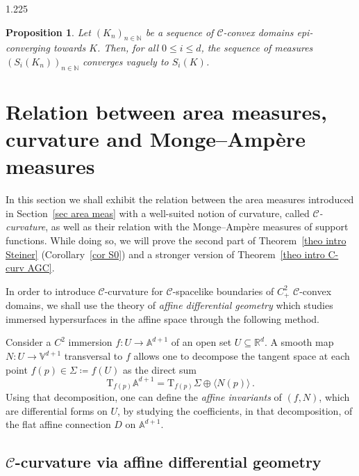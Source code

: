 \documentclass[reqno, a4paper]{amsart}
\numberwithin{equation}{section}
\numberwithin{figure}{section}
\newtheorem{proposition}[theorem]{Proposition}
\theoremstyle{definition}
\theoremstyle{remark}
\newcommand{\R}{\mathbb{R}} %
\newcommand{\N}{\mathbb{N}} %
\newcommand{\V}{\mathbb{V}} %
\newcommand{\A}{\mathbb{A}} %
\newcommand{\C}{\mathcal{C}} %
\begin{document}
\begin{spacing}{1.225}
\begin{proposition}
\label{prop vague convergence of Si}
Let $(K_n)_{n\in\N}$ be a sequence of $\C$-convex domains epi-converging towards $K$. Then, for all $0 \leq i \leq d$, the sequence of measures $(S_i(K_n))_{n\in\N}$ converges vaguely to $S_i(K)$. 
\end{proposition}

\section{Relation between area measures, curvature and Monge--Amp\`ere measures}
\label{sec relation area measure curvature and MA}

In this section we shall exhibit the relation between the area measures introduced in Section~\ref{sec area meas} with a well-suited notion of curvature, called \emph{$\C$-curvature}, as well as their relation with the Monge--Amp\`ere measures of support functions. While doing so, we will prove the second part of Theorem~\ref{theo intro Steiner} (Corollary~\ref{cor S0}) and a stronger version of Theorem~\ref{theo intro C-curv AGC}.

In order to introduce $\C$-curvature for $\C$-spacelike boundaries of $C^2_+$ $\C$-convex domains, we shall use the theory of \emph{affine differential geometry} \cite{Nomizu_Sassaki_95,LSZH_15} which studies immersed hypersurfaces in the affine space through the following method. 

Consider a $C^2$ immersion $f: U \to \A^{d+1}$ of an open set $U \subseteq \R^d$. A smooth map $N: U \to \V^{d+1}$ transversal to $f$ allows one to decompose the tangent space at each point $f(p) \in \Sigma \coloneqq f(U)$ as the direct sum 
\begin{equation*}
\mathrm{T}_{f(p)}\A^{d+1} = \mathrm{T}_{f(p)}\Sigma \oplus \bigl\langle N(p)\bigr\rangle \, .
\end{equation*}
Using that decomposition, one can define the \emph{affine invariants} of $(f,N)$, which are differential forms on $U$, by studying the coefficients, in that decomposition, of the flat affine connection $D$ on $\A^{d+1}$. 

\subsection{\texorpdfstring{$\C$-curvature via affine differential geometry}{C-curvature via affine differential geometry}}
\label{subsec Affine differential geometry}


\end{spacing}
\end{document}

